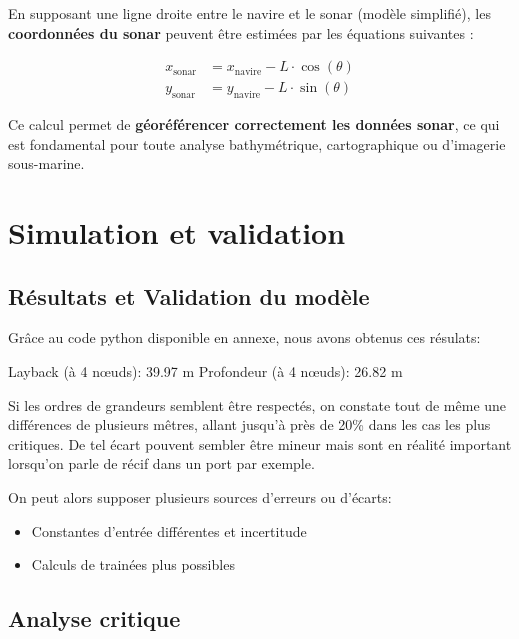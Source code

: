 \documentclass[12pt,a4paper]{report}
\begin{document}
En supposant une ligne droite entre le navire et le sonar (modèle simplifié), les \textbf{coordonnées du sonar} peuvent être estimées par les équations suivantes :

\begin{align*}
x_{\text{sonar}} &= x_{\text{navire}} - L \cdot \cos(\theta) \\
y_{\text{sonar}} &= y_{\text{navire}} - L \cdot \sin(\theta)
\end{align*}


Ce calcul permet de \textbf{géoréférencer correctement les données sonar}, ce qui est fondamental pour toute analyse bathymétrique, cartographique ou d'imagerie sous-marine.

\newpage


\section{Simulation et validation}

\subsection{Résultats et Validation du modèle}


Grâce au code python disponible en annexe, nous avons obtenus ces résulats:

Layback (à 4 nœuds): 39.97 m
Profondeur (à 4 nœuds): 26.82 m

Si les ordres de grandeurs semblent être respectés, on constate tout de même une différences de plusieurs mêtres,
allant jusqu'à près de 20\% dans les cas les plus critiques.
De tel écart pouvent sembler être mineur mais sont en réalité important lorsqu'on parle de récif dans un port par exemple.

On peut alors supposer plusieurs sources d'erreurs ou d'écarts:
\begin{itemize}
  \item Constantes d'entrée différentes et incertitude
  \item Calculs de trainées plus possibles
\end{itemize}

\subsection{Analyse critique}
\end{document}
